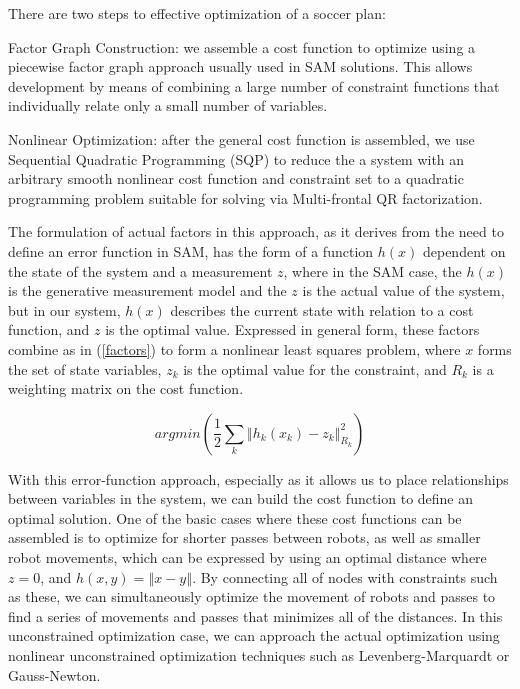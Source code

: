\documentclass[a4paper, 10pt, conference]{ieeeconf}      %
\begin{document}
There are two steps to effective optimization of a soccer plan:
\begin{description}
 \item{Factor Graph Construction}: we assemble a cost function to optimize using a piecewise factor graph approach usually used in SAM solutions.  This allows development by means of combining a large number of constraint functions that individually relate only a small number of variables.
\item{Nonlinear Optimization}: after the general cost function is assembled, we use Sequential Quadratic Programming (SQP) to reduce the a system with an arbitrary smooth nonlinear cost function and constraint set to a quadratic programming problem suitable for solving via Multi-frontal QR factorization.  
 \end{description}

The formulation of actual factors in this approach, as it derives from the need to define an error function in SAM, has the form of a function $h(x)$ dependent on the state of the system and a measurement $z$, where in the SAM case, the $h(x)$ is the generative measurement model and the $z$ is the actual value of the system, but in our system, $h(x)$ describes the current state with relation to a cost function, and $z$ is the optimal value.  Expressed in general form, these factors combine as in (\ref{factors}) to form a nonlinear least squares problem, where $x$ forms the set of state variables, $z_{k}$ is the optimal value for the constraint, and $R_{k}$ is a weighting matrix on the cost function.

\begin{equation} \label{factors}
 argmin(\frac{1}{2}\sum_{k}\left\Vert h_{k}(x_{k})-z_{k}\right\Vert _{R_{k}}^{2})
\end{equation} 

With this error-function approach, especially as it allows us to place relationships between variables in the system, we can build the cost function to define an optimal solution.  One of the basic cases where these cost functions can be assembled is to optimize for shorter passes between robots, as well as smaller robot movements, which can be expressed by using an optimal distance where $z=0$, and $h(x,y)=\left\Vert x-y \right\Vert$.  By connecting all of nodes with constraints such as these, we can simultaneously optimize the movement of robots and passes to find a series of movements and passes that minimizes all of the distances.  In this unconstrained optimization case, we can approach the actual optimization using nonlinear unconstrained optimization techniques such as Levenberg-Marquardt or Gauss-Newton. 
\end{document}
